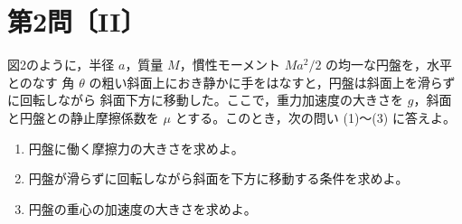 \section*{第2問〔II〕}

図2のように，半径 $a$，質量 $M$，慣性モーメント $Ma^2/2$ の均一な円盤を，水平とのなす
角 $\theta$ の粗い斜面上におき静かに手をはなすと，円盤は斜面上を滑らずに回転しながら
斜面下方に移動した。ここで，重力加速度の大きさを $g$，斜面と円盤との静止摩擦係数を
$\mu$ とする。このとき，次の問い (1)〜(3) に答えよ。

\begin{enumerate}[label=(\arabic*)]
  \item 円盤に働く摩擦力の大きさを求めよ。
  \item 円盤が滑らずに回転しながら斜面を下方に移動する条件を求めよ。
  \item 円盤の重心の加速度の大きさを求めよ。
\end{enumerate}

\begin{center}
\end{center}
